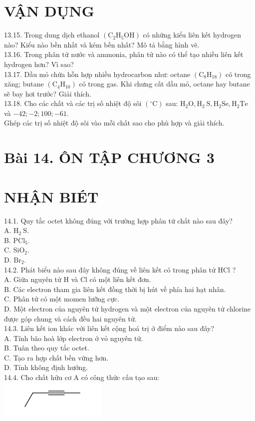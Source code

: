 \documentclass[10pt]{article}
\begin{document}
\section*{VẬN DỤNG}
13.15. Trong dung dịch ethanol $\left(\mathrm{C}_{2} \mathrm{H}_{5} \mathrm{OH}\right)$ có những kiểu liên kết hydrogen nào? Kiểu nào bền nhất và kém bền nhất? Mô tả bằng hình vẽ.\\
13.16. Trong phân tử nước và ammonia, phân tử nào có thể tạo nhiều liên kết hydrogen hơn? Vì sao?\\
13.17. Dầu mỏ chứa hỗn hợp nhiều hydrocarbon như: octane $\left(\mathrm{C}_{8} \mathrm{H}_{18}\right)$ có trong xăng; butane $\left(\mathrm{C}_{4} \mathrm{H}_{10}\right)$ có trong gas. Khi chưng cất dầu mỏ, octane hay butane sẽ bay hơi trước? Giải thích.\\
13.18. Cho các chất và các trị số nhiệt độ sôi $\left({ }^{\circ} \mathrm{C}\right)$ sau: $\mathrm{H}_{2} \mathrm{O}, \mathrm{H}_{2} \mathrm{~S}, \mathrm{H}_{2} \mathrm{Se}, \mathrm{H}_{2} \mathrm{Te}$ và $-42 ;-2 ; 100 ;-61$.\\
Ghép các trị số nhiệt độ sôi vào mỗi chất sao cho phù hợp và giải thích.

\section*{Bài 14. ÔN TẬP CHƯƠNG 3}
\section*{NHẬN BIÉT}
14.1. Quy tắc octet không đúng với trường hợp phân tử chất nào sau đây?\\
A. $\mathrm{H}_{2} \mathrm{~S}$.\\
B. $\mathrm{PCl}_{5}$.\\
C. $\mathrm{SiO}_{2}$.\\
D. $\mathrm{Br}_{2}$.\\
14.2. Phát biểu nào sau đây không đúng về liên kết có trong phân tử HCl ?\\
A. Giữa nguyên tử H và Cl có một liên kết đơn.\\
B. Các electron tham gia liên kết đồng thời bị hút về phía hai hạt nhân.\\
C. Phân tử có một momen lưỡng cực.\\
D. Một electron của nguyên tử hydrogen và một electron của nguyên tử chlorine được góp chung và cách đều hai nguyên tử.\\
14.3. Liên kết ion khác với liên kết cộng hoá trị ở điểm nào sau đây?\\
A. Tính bão hoà lớp electron ở vỏ nguyên tử.\\
B. Tuân theo quy tắc octet.\\
C. Tạo ra hợp chất bền vững hơn.\\
D. Tính không định hướng.\\
14.4. Cho chất hữu cơ A có công thức cấu tạo sau:\\
\includegraphics{smile-3ebd5113c46e76d4b747ac128c0dac6bcfd60367}
\end{document}
